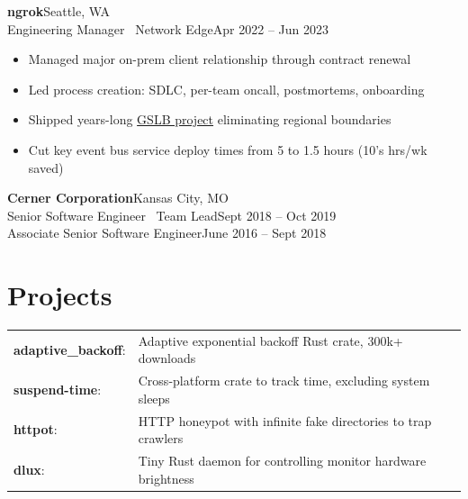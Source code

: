\documentclass[margin]{res}
\newcommand{\github}[0]%
{%
  \hspace{-4mm}\faIcon{github}\hspace{1mm}%
}
\begin{document}
\begin{resume}
       \textbf{ngrok}\hfill Seattle, WA\\
         Engineering Manager \textbar \ Network Edge\hfill Apr 2022 -- Jun 2023\\
         \begin{itemize} \itemsep -1pt  %
            \item Managed major on-prem client relationship through contract renewal
            \item Led process creation: SDLC, per-team oncall, postmortems, onboarding
            \item Shipped years-long \href{https://ngrok.com/blog/gslb-global-server-load-balancing}{GSLB project} eliminating regional boundaries
            \item Cut key event bus service deploy times from 5 to 1.5 hours (10's hrs/wk saved)
         \end{itemize}

       \textbf{Cerner Corporation}\hfill Kansas City, MO\\
         Senior Software Engineer \textbar \ Team Lead\hfill Sept 2018 -- Oct 2019 \\
         Associate Senior Software Engineer\hfill June 2016 -- Sept 2018 \\

    \section{Projects}
      \begin{tabular}{l p{4in}}
        \href{https://github.com/brhoades/adaptive-backoff}{\github}\textbf{adaptive\_backoff}:     & Adaptive exponential backoff Rust crate, 300k+ downloads \\ [1pt]
        \href{https://github.com/Rippling/suspend-time}{\github}\textbf{suspend-time}:              & Cross-platform crate to track time, excluding system sleeps \\ [1pt]
        \href{https://github.com/brhoades/httpot}{\github}\textbf{httpot}:                          & HTTP honeypot with infinite fake directories to trap crawlers \\ [1pt]
        \href{https://github.com/brhoades/dlux}{\github}\textbf{dlux}:                              & Tiny Rust daemon for controlling monitor hardware brightness \\ [1pt]
      \end{tabular}


\end{resume}
\end{document}
